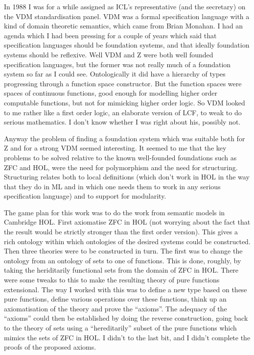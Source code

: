 In 1988 I was for a while assigned as ICL's representative (and the secretary) on the VDM standardisation panel.
VDM was a formal specification language with a kind of domain theoretic semantics, which came from Brian Monahan.
I had an agenda which I had been pressing for a couple of years which said that specification languages should be foundation systems, and that ideally foundation systems should be reflexive.
Well VDM and Z were both well founded specification languages, but the former was not really much of a foundation system so far as I could see.
Ontologically it did have a hierarchy of types progressing through a function space constructor.
But the function spaces were spaces of continuous functions, good enough for modelling higher order computable functions, but not for mimicking higher order logic.
So VDM looked to me rather like a first order logic, an elaborate version of LCF, to weak to do serious mathematics.
I don't know whether I was right about his, possibly not.

Anyway the problem of finding a foundation system which was suitable both for Z and for a strong VDM seemed interesting.
It seemed to me that the key problems to be solved relative to the known well-founded foundations such as ZFC and HOL, were the need for polymorphism and the need for structuring.
Structuring relates both to local definitions (which don't work in HOL in the way that they do in ML and in which one needs them to work in any serious specification language) and to support for modularity.

The game plan for this work was to do the work from semantic models in Cambridge HOL.
First axiomatise ZFC in HOL (not worrying about the fact that the result would be strictly stronger than the first order version).
This gives a rich ontology within which ontologies of the desired systems could be constructed.
Then three theories were to be constructed in turn.
The first was to change the ontology from an ontology of sets to one of functions.
This is done, roughly, by taking the heriditarily functional sets from the domain of ZFC in HOL.
There were some tweaks to this to make the resulting theory of pure functions extensional.
The way I worked with this was to define a new type based on these pure functions, define various operations over these functions, think up an axiomatisation of the theory and prove the ``axioms''.
The adequacy of the ``axioms'' could then be established by doing the reverse construction, going back to the theory of sets using a ``hereditarily'' subset of the pure functions which mimics the sets of ZFC in HOL.
I didn't to the last bit, and I didn't complete the proofs of the proposed axioms.

